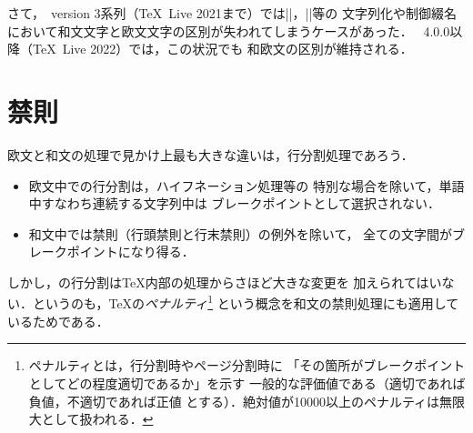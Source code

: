 \documentclass[a4paper,11pt,nomag,dvipdfmx]{jsarticle}
\def\code#1{\texttt{#1}}
\begin{document}
さて，\pTeX~version 3系列（\TeX~Live 2021まで）では|\meaning|，|\string|等の
文字列化や制御綴名において和文文字と欧文文字の区別が失われてしまうケースがあった．
\pTeX~4.0.0以降（\TeX~Live 2022）では，この状況でも
和欧文の区別が維持される\cite{tjb81}．

\section{禁則}
\label{sec:kinsoku}
欧文と和文の処理で見かけ上最も大きな違いは，行分割処理であろう．
\begin{itemize}
\item 欧文中での行分割は，ハイフネーション処理等の
      特別な場合を除いて，単語中すなわち連続する文字列中は
      ブレークポイントとして選択されない．
\item 和文中では禁則（行頭禁則と行末禁則）の例外を除いて，
      全ての文字間がブレークポイントになり得る．
\end{itemize}
しかし，\pTeX の行分割は\TeX 内部の処理からさほど大きな変更を
加えられてはいない．というのも，\TeX の\emph{ペナルティ}\footnote{%
ペナルティとは，行分割時やページ分割時に
「その箇所がブレークポイントとしてどの程度適切であるか」を示す
一般的な評価値である（適切であれば負値，不適切であれば正値
とする）．絶対値が10000以上のペナルティは無限大として扱われる．}%
という概念を和文の禁則処理にも適用しているためである．
\end{document}
